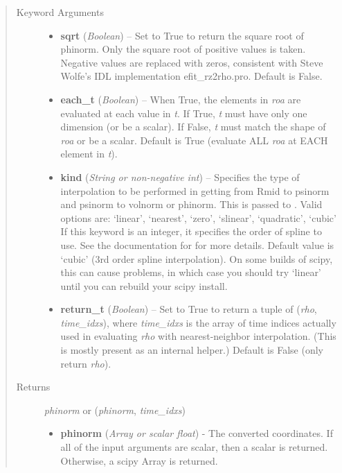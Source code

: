 \documentclass[letterpaper,10pt,english]{sphinxmanual}
\begin{document}
\begin{fulllineitems}
\begin{fulllineitems}
\begin{quote}
\begin{description}
\item[{Keyword Arguments}] \leavevmode\begin{itemize}
\item {} 
\textbf{sqrt} (\emph{Boolean}) --
Set to True to return the square root of phinorm.
Only the square root of positive values is taken. Negative
values are replaced with zeros, consistent with Steve Wolfe's
IDL implementation efit\_rz2rho.pro. Default is False.

\item {} 
\textbf{each\_t} (\emph{Boolean}) --
When True, the elements in \emph{roa} are evaluated
at each value in \emph{t}. If True, \emph{t} must have only one dimension
(or be a scalar). If False, \emph{t} must match the shape of \emph{roa}
or be a scalar. Default is True (evaluate ALL \emph{roa} at EACH
element in \emph{t}).

\item {} 
\textbf{kind} (\emph{String or non-negative int}) --
Specifies the type of
interpolation to be performed in getting from Rmid to
psinorm and psinorm to volnorm or phinorm. This is passed to
. Valid options are:
`linear', `nearest', `zero', `slinear', `quadratic', `cubic'
If this keyword is an integer, it specifies the order of spline
to use. See the documentation for  for more
details. Default value is `cubic' (3rd order spline
interpolation). On some builds of scipy, this can cause problems,
in which case you should try `linear' until you can rebuild your
scipy install.

\item {} 
\textbf{return\_t} (\emph{Boolean}) --
Set to True to return a tuple of (\emph{rho},
\emph{time\_idxs}), where \emph{time\_idxs} is the array of time indices
actually used in evaluating \emph{rho} with nearest-neighbor
interpolation. (This is mostly present as an internal helper.)
Default is False (only return \emph{rho}).

\end{itemize}

\item[{Returns}] \leavevmode

\emph{phinorm} or (\emph{phinorm}, \emph{time\_idxs})
\begin{itemize}
\item {} 
\textbf{phinorm} (\emph{Array or scalar float}) - The converted coordinates. If
all of the input arguments are scalar, then a scalar is returned.
Otherwise, a scipy Array is returned.


\end{itemize}
\end{description}
\end{quote}
\end{fulllineitems}
\end{fulllineitems}
\end{document}
